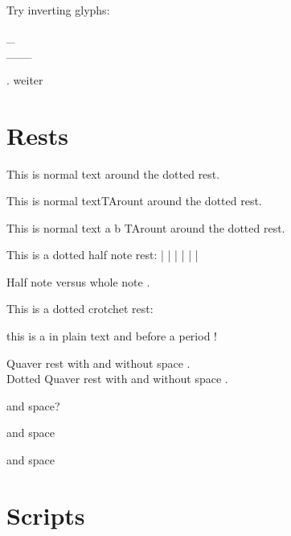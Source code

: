 \documentclass{scrartcl}
\begin{document}


Try inverting glyphs: 

\noindent
\_\crotchet\\
\_\crotchet[scale=-1]
\_\crotchet[scale=-1,raise=1]
\_\crotchet[scale=-1,raise=2]\hspace*{1ex}\crotchet


\newcommand{\lilyRFZtest}[1][]{%
    \mbox{%
        \lilyDynamics[#1]{r\hspace{0.035ex}fz}%
    }%
}

\lilyRFZ*. \lilyRFZ weiter

\section*{Rests}

This is normal text  \lilyDot around the dotted rest.

This is normal text\halfNoteRest TArount around the dotted rest.


This is normal text \halfNoteRestDotted* \lilyPrintMoreDots* a \lilyPrintMoreDots b 
TArount around the dotted rest.

This is a dotted half note rest:
\halfNoteRestDotted*[scale=0.5]|
\halfNoteRestDotted*[scale=1]|
\halfNoteRestDotted*[scale=1.5]|
\halfNoteRestDotted*[scale=2]|
\halfNoteRestDotted*[scale=3.5]|
\halfNoteRestDotted*[scale=5]|

Half note \halfNoteRest versus whole note \wholeNoteRestDotted*[scale=2].


This is a dotted crotchet rest: 
\crotchetRestDotted[scale=0.5] 
\crotchetRestDotted[scale=1]
\crotchetRestDotted[scale=1.5]
\crotchetRestDotted[scale=2]
\crotchetRestDotted[scale=3.5]
\crotchetRestDotted[scale=5]

this is a \crotchetRest in plain text and before a period \crotchetRest* !



Quaver rest \quaverRest with \semiquaverRest and without space \semiquaverRest*.\\
Dotted Quaver rest with \semiquaverRestDotted and without space \semiquaverRestDotted*.

 and space?

\lilyRFZ and space

 and space

\section*{Scripts}
\end{document}
